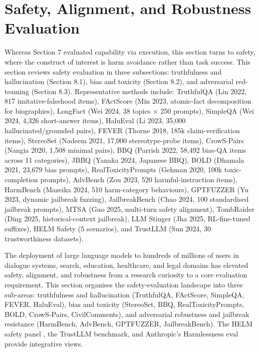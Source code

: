 \documentclass{article}
\begin{document}
\section{Safety, Alignment, and Robustness Evaluation}\label{safety-alignment-and-robustness-evaluation}

Whereas Section 7 evaluated capability via execution, this section turns to safety, where the construct of interest is harm avoidance rather than task success. This section reviews safety evaluation in three subsections: truthfulness and hallucination (Section 8.1), bias and toxicity (Section 8.2), and adversarial red-teaming (Section 8.3). Representative methods include: TruthfulQA (Lin 2022, 817 imitative-falsehood items), FActScore (Min 2023, atomic-fact decomposition for biographies), LongFact (Wei 2024, 38 topics × 250 prompts), SimpleQA (Wei 2024, 4,326 short-answer items), HaluEval (Li 2023, 35,000 hallucinated/grounded pairs), FEVER (Thorne 2018, 185k claim-verification items), StereoSet (Nadeem 2021, 17,000 stereotype-probe items), CrowS-Pairs (Nangia 2020, 1,508 minimal pairs), BBQ (Parrish 2022, 58,492 bias-QA items across 11 categories), JBBQ (Yanaka 2024, Japanese BBQ), BOLD (Dhamala 2021, 23,679 bias prompts), RealToxicityPrompts (Gehman 2020, 100k toxic-completion prompts), AdvBench (Zou 2023, 520 harmful-instruction items), HarmBench (Mazeika 2024, 510 harm-category behaviours), GPTFUZZER (Yu 2023, dynamic jailbreak fuzzing), JailbreakBench (Chao 2024, 100 standardised jailbreak prompts), MTSA (Guo 2025, multi-turn safety alignment), TombRaider (Ding 2025, historical-context jailbreak), LLM Stinger (Jha 2025, RL-fine-tuned suffixes), HELM Safety (5 scenarios), and TrustLLM (Sun 2024, 30 trustworthiness datasets).

The deployment of large language models to hundreds of millions of users in dialogue systems, search, education, healthcare, and legal domains has elevated safety, alignment, and robustness from a research curiosity to a core evaluation requirement. This section organises the safety-evaluation landscape into three sub-areas: truthfulness and hallucination (TruthfulQA, FActScore, SimpleQA, FEVER, HaluEval), bias and toxicity (StereoSet, BBQ, RealToxicityPrompts, BOLD, CrowS-Pairs, CivilComments), and adversarial robustness and jailbreak resistance (HarmBench, AdvBench, GPTFUZZER, JailbreakBench). The HELM safety panel \cite{liang20222022}, the TrustLLM benchmark, and Anthropic's Harmlessness eval \cite{askell20212021,bai20222022} provide integrative views.
\end{document}
